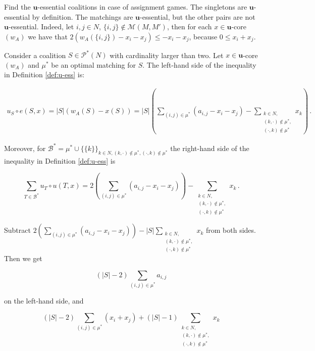 \documentclass[a4paper,12pt]{article}
\theoremstyle{definition}
\theoremstyle{remark}
\begin{document}
Find the $\mathbf{u}$-essential coalitions in case of assignment games. The singletons are $\mathbf{u}$-essential by definition. The matchings are $\mathbf{u}$-essential, but the other pairs are not $\mathbf{u}$-essential. Indeed, let $i, j \in N$, $\{ i, j \} \notin \mathcal{M}(M, M')$, then for each $x\in \mathbf{u}$-core$(w_A)$ we have that  $2(w_A(\{ i, j \} ) - x_i - x_j) \leq -x_i-x_j$, because $0\leq x_i + x_j$.

Consider a coalition $S\in \mathcal{P}^*(N)$ with cardinality larger than two. Let $x\in \mathbf{u}$-core$(w_A)$ and $\mu^*$ be an optimal matching for $S$. The left-hand side of the inequality in Definition \ref{def:u-ess} is:

\begin{equation*}\label{eq:left}
\begin{split}
u_S\circ e(S, x) = |S|(w_A(S)-x(S))
= |S|\left(\sum_{(i, j)\in \mu^*} (a_{i, j} - x_i - x_j) - \sum_{\substack{ k \in N,\\ (k, \cdot )\notin \mu^*,\\ (\cdot , k) \notin \mu^*}} x_k \right) \, .
\end{split}
\end{equation*}

\noindent Moreover, for $\mathcal{B}^* =  \mu^* \cup \{ \{ k \} \}_{ k \in N, (k, \cdot )\notin \mu^*, (\cdot , k) \notin \mu^*}$ the right-hand side of the inequality in Definition \ref{def:u-ess} is

\begin{equation}\label{eq:right}
\sum_{T\in \mathcal{B}^*} u_T\circ u(T, x) = 2 \left( \sum_{(i, j)\in \mu^*} (a_{i, j} - x_i - x_j) \right) - \sum_{\substack{ k \in N,\\ (k, \cdot )\notin \mu^*,\\ (\cdot , k) \notin \mu^*}} x_k \, .
\end{equation}

\noindent Subtract $2(\sum_{(i, j)\in \mu^*} (a_{i, j} - x_i - x_j)) - |S|\sum_{\substack{ k \in N,\\ (k, \cdot )\notin \mu^*,\\ (\cdot , k) \notin \mu^*}} x_k$ from both sides. Then we get

\begin{equation*}
(|S|-2) \sum_{(i, j) \in \mu^*} a_{i, j}
\end{equation*}

\noindent on the left-hand side, and

\begin{equation*}
(|S|-2)\sum_{(i, j) \in \mu^*}( x_i + x_j ) + (|S| - 1) \sum_{\substack{ k \in N,\\ (k, \cdot )\notin \mu^*,\\ (\cdot , k) \notin \mu^*}} x_k
\end{equation*}
\end{document}
